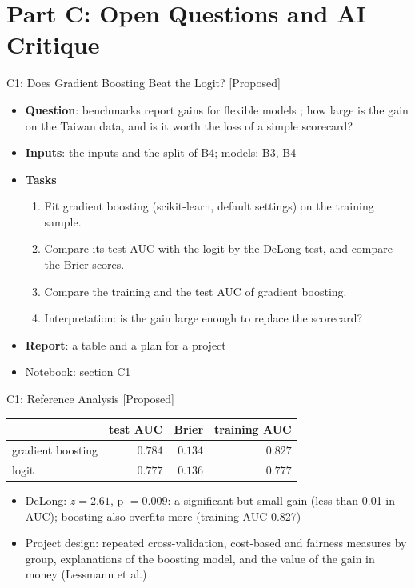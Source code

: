 \section{Part C: Open Questions and AI Critique}

\begin{frame}{C1: Does Gradient Boosting Beat the Logit? [Proposed]}
\itemsize{\footnotesize}
\begin{itemize}
\item \textbf{Question}: benchmarks report gains for flexible models ; how large is the gain on the Taiwan data, and is it worth the loss of a simple scorecard?
\item \textbf{Inputs}: the inputs and the split of B4; models: B3, B4
\item \textbf{Tasks}
\begin{enumerate}
    \item Fit gradient boosting (scikit-learn, default settings) on the training sample.
    \item Compare its test AUC with the logit by the DeLong test, and compare the Brier scores.
    \item Compare the training and the test AUC of gradient boosting.
    \item Interpretation: is the gain large enough to replace the scorecard?
\end{enumerate}
\item \textbf{Report}: a table and a plan for a project
\item Notebook: section C1
\end{itemize}
\end{frame}

\ifsolutions
\begin{frame}{C1: Reference Analysis [Proposed]}
\itemsize{\footnotesize}
\begin{center}
\scriptsize
\begin{tabular}{lrrr}
\toprule
& test AUC & Brier & training AUC \\
\midrule
gradient boosting & $0.784$ & $0.134$ & $0.827$ \\
logit & $0.777$ & $0.136$ & $0.777$ \\
\bottomrule
\end{tabular}
\end{center}
\begin{itemize}
    \item DeLong: $z = 2.61$, p $= 0.009$: a significant but small gain (less than 0.01 in AUC); boosting also overfits more (training AUC 0.827)
    \item Project design: repeated cross-validation, cost-based and fairness measures by group, explanations of the boosting model, and the value of the gain in money (Lessmann et al.)
\end{itemize}
\end{frame}
\fi

